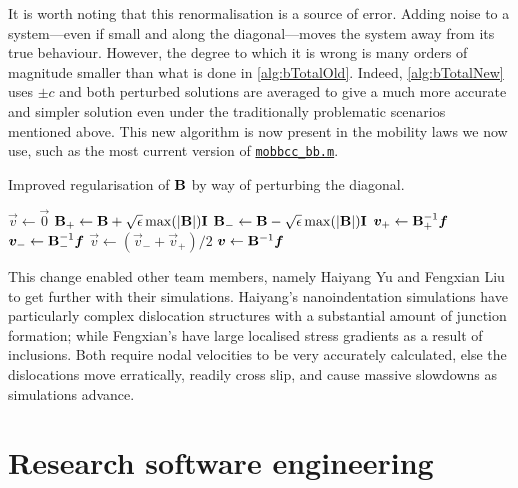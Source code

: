 It is worth noting that this renormalisation is a source of error. Adding noise to a system---even if small and along the diagonal---moves the system away from its true behaviour. However, the degree to which it is wrong is many orders of magnitude smaller than what is done in \cref{alg:bTotalOld}. Indeed, \cref{alg:bTotalNew} uses $\pm c $ and both perturbed solutions are averaged to give a much more accurate and simpler solution even under the traditionally problematic scenarios mentioned above. This new algorithm is now present in the mobility laws we now use, such as the most current version of \href{https://github.com/TarletonGroup/EasyDD/blob/372984499dd60136fc7badabd6cee192058d55d9/src/mobbcc_bb1b.m#L199}{\texttt{mobbcc\_bb.m}}.
\begin{algorithm}
    \caption[Dampening the drag matrix inversion singularity.]{Improved regularisation of $\mathbf{B}$ by way of perturbing the diagonal.}
    \label{alg:bTotalNew}
    \begin{algorithmic}
        \State $\vec{v} \gets \vec{0}$
        \State $\mathbf{B}_+ \gets \mathbf{B} + \sqrt{\epsilon} \max(\mathbf{\lvert B\rvert}) \mathbf{I}$
        \State $\mathbf{B}_- \gets \mathbf{B} - \sqrt{\epsilon} \max(\mathbf{\lvert B\rvert}) \mathbf{I}$
        \State $\vec{v}_+ \gets \mtx{B}_+^{-1} \vec{f}$
        \State $\vec{v}_- \gets \mtx{B}_-^{-1} \vec{f}$
        \State $\vec{v} \gets (\vec{v}_- + \vec{v}_+)/2$
        \Else
        \State $\vec{v} \gets \mtx{B}^{-1} \vec{f}$
        \EndIf
    \end{algorithmic}
\end{algorithm}

This change enabled other team members, namely Haiyang Yu and Fengxian Liu to get further with their simulations. Haiyang's nanoindentation simulations have particularly complex dislocation structures with a substantial amount of junction formation; while Fengxian's have large localised stress gradients as a result of inclusions. Both require nodal velocities to be very accurately calculated, else the dislocations move erratically, readily cross slip, and cause massive slowdowns as simulations advance.

\section{Research software engineering}
\label{s:rse}

